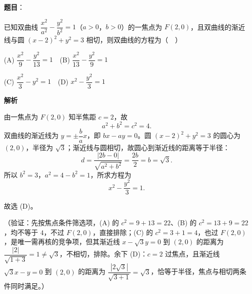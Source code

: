 \begin{answer}

\textbf{题目}：

已知双曲线 \(\dfrac{x^2}{a^2}-\dfrac{y^2}{b^2}=1\)（\(a>0\)，\(b>0\)）的一焦点为 \(F(2,0)\)，且双曲线的渐近线与圆 \((x-2)^2+y^2=3\) 相切，则双曲线的方程为（　）

(A) \(\dfrac{x^2}{9}-\dfrac{y^2}{13}=1\)　(B) \(\dfrac{x^2}{13}-\dfrac{y^2}{9}=1\)

(C) \(\dfrac{x^2}{3}-y^2=1\)　(D) \(x^2-\dfrac{y^2}{3}=1\)

\textbf{解析}

由一焦点为 \(F(2,0)\) 知半焦距 \(c=2\)，故
\nopagebreak[4]
\[
a^2+b^2=c^2=4.
\]
双曲线的渐近线为 \(y=\pm\dfrac{b}{a}x\)，即 \(bx-ay=0\)。圆 \((x-2)^2+y^2=3\) 的圆心为 \((2,0)\)，半径为 \(\sqrt3\)；渐近线与圆相切，故圆心到渐近线的距离等于半径：
\nopagebreak[4]
\[
d=\dfrac{|2b-0|}{\sqrt{a^2+b^2}}=\dfrac{2b}{2}=b=\sqrt3.
\]
所以 \(b^2=3\)，\(a^2=4-b^2=1\)，所求方程为
\nopagebreak[4]
\[
x^2-\dfrac{y^2}{3}=1.
\]

故选 (D)。

（验证：先按焦点条件筛选项，(A) 的 \(c^2=9+13=22\)、(B) 的 \(c^2=13+9=22\)，均不等于 \(4\)，不过 \(F(2,0)\)，直接排除；(C) 的 \(c^2=3+1=4\)，也过 \(F(2,0)\)，是唯一需再核的竞争项，但其渐近线 \(x-\sqrt3 y=0\) 到 \((2,0)\) 的距离为 \(\dfrac{|2|}{\sqrt{1+3}}=1\neq\sqrt3\)，不相切，排除。余下 (D)：\(c=2\) 过焦点，且渐近线 \(\sqrt3 x-y=0\) 到 \((2,0)\) 的距离为 \(\dfrac{|2\sqrt3|}{\sqrt{3+1}}=\sqrt3\)，恰等于半径，焦点与相切两条件同时满足。）


\end{answer}
